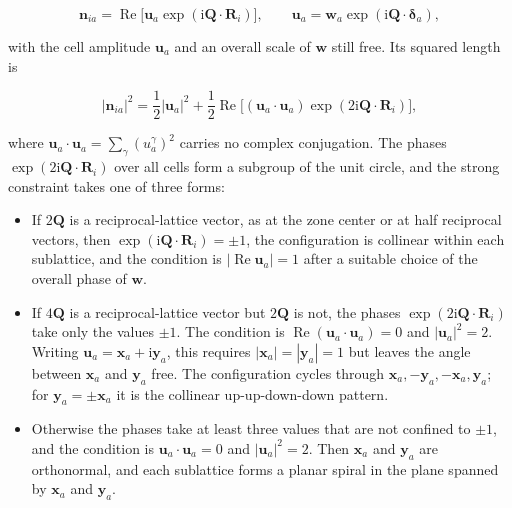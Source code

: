 \[
\mathbf n_{ia}=\operatorname{Re}\!\big[\mathbf u_a\exp(\mathrm i\mathbf Q\cdot\mathbf R_i)\big],
\qquad
\mathbf u_a=\mathbf w_a\exp(\mathrm i\mathbf Q\cdot\boldsymbol\delta_a),
\]

with the cell amplitude \(\mathbf u_a\) and an overall scale of \(\mathbf w\) still free. Its squared length is

\begin{equation}\label{eq-lswt-lt-single-q-length}
|\mathbf n_{ia}|^2=\frac12|\mathbf u_a|^2+\frac12\operatorname{Re}\!\big[(\mathbf u_a\cdot\mathbf u_a)\exp(2\mathrm i\mathbf Q\cdot\mathbf R_i)\big],
\end{equation}

where \(\mathbf u_a\cdot\mathbf u_a=\sum_\gamma(u_a^\gamma)^2\) carries no complex conjugation. The phases \(\exp(2\mathrm i\mathbf Q\cdot\mathbf R_i)\) over all cells form a subgroup of the unit circle, and the strong constraint takes one of three forms:

\begin{itemize}
\tightlist
\item
  If \(2\mathbf Q\) is a reciprocal-lattice vector, as at the zone center or at half reciprocal vectors, then \(\exp(\mathrm i\mathbf Q\cdot\mathbf R_i)=\pm1\), the configuration is collinear within each sublattice, and the condition is \(|\operatorname{Re}\mathbf u_a|=1\) after a suitable choice of the overall phase of \(\mathbf w\).
\item
  If \(4\mathbf Q\) is a reciprocal-lattice vector but \(2\mathbf Q\) is not, the phases \(\exp(2\mathrm i\mathbf Q\cdot\mathbf R_i)\) take only the values \(\pm1\). The condition is \(\operatorname{Re}(\mathbf u_a\cdot\mathbf u_a)=0\) and \(|\mathbf u_a|^2=2\). Writing \(\mathbf u_a=\mathbf x_a+\mathrm i\mathbf y_a\), this requires \(|\mathbf x_a|=|\mathbf y_a|=1\) but leaves the angle between \(\mathbf x_a\) and \(\mathbf y_a\) free. The configuration cycles through \(\mathbf x_a,-\mathbf y_a,-\mathbf x_a,\mathbf y_a\); for \(\mathbf y_a=\pm\mathbf x_a\) it is the collinear up-up-down-down pattern.
\item
  Otherwise the phases take at least three values that are not confined to \(\pm1\), and the condition is \(\mathbf u_a\cdot\mathbf u_a=0\) and \(|\mathbf u_a|^2=2\). Then \(\mathbf x_a\) and \(\mathbf y_a\) are orthonormal, and each sublattice forms a planar spiral in the plane spanned by \(\mathbf x_a\) and \(\mathbf y_a\).
\end{itemize}

